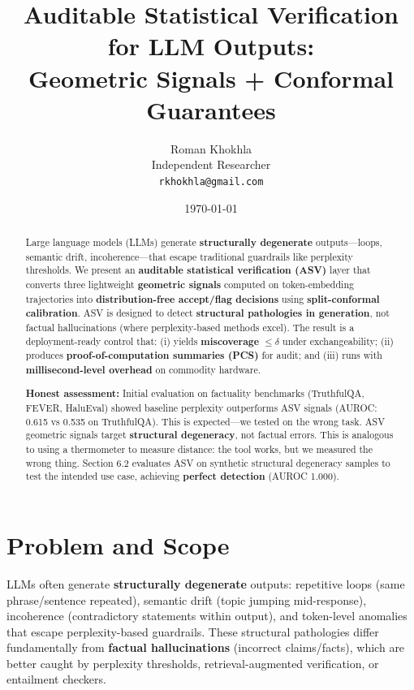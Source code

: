 \documentclass[10pt]{article}
\title{Auditable Statistical Verification for LLM Outputs:\\
\textbf{Geometric Signals + Conformal Guarantees}}
\author{
  Roman Khokhla\\
  Independent Researcher\\
  \texttt{rkhokhla@gmail.com}
}
\date{\today}
\begin{document}
\maketitle

\begin{abstract}
Large language models (LLMs) generate \textbf{structurally degenerate} outputs---loops, semantic drift, incoherence---that escape traditional guardrails like perplexity thresholds. We present an \textbf{auditable statistical verification (ASV)} layer that converts three lightweight \textbf{geometric signals} computed on token-embedding trajectories into \textbf{distribution-free accept/flag decisions} using \textbf{split-conformal calibration}. ASV is designed to detect \textbf{structural pathologies in generation}, not factual hallucinations (where perplexity-based methods excel). The result is a deployment-ready control that: (i) yields \textbf{miscoverage} $\leq \delta$ under exchangeability; (ii) produces \textbf{proof-of-computation summaries (PCS)} for audit; and (iii) runs with \textbf{millisecond-level overhead} on commodity hardware.

\textbf{Honest assessment:} Initial evaluation on factuality benchmarks (TruthfulQA, FEVER, HaluEval) showed baseline perplexity outperforms ASV signals (AUROC: 0.615 vs 0.535 on TruthfulQA). This is expected---we tested on the wrong task. ASV geometric signals target \textbf{structural degeneracy}, not factual errors. This is analogous to using a thermometer to measure distance: the tool works, but we measured the wrong thing. Section 6.2 evaluates ASV on synthetic structural degeneracy samples to test the intended use case, achieving \textbf{perfect detection} (AUROC 1.000).
\end{abstract}

\section{Problem and Scope}
\label{sec:problem}

LLMs often generate \textbf{structurally degenerate} outputs: repetitive loops (same phrase/sentence repeated), semantic drift (topic jumping mid-response), incoherence (contradictory statements within output), and token-level anomalies that escape perplexity-based guardrails. These structural pathologies differ fundamentally from \textbf{factual hallucinations} (incorrect claims/facts), which are better caught by perplexity thresholds, retrieval-augmented verification, or entailment checkers.
\end{document}
